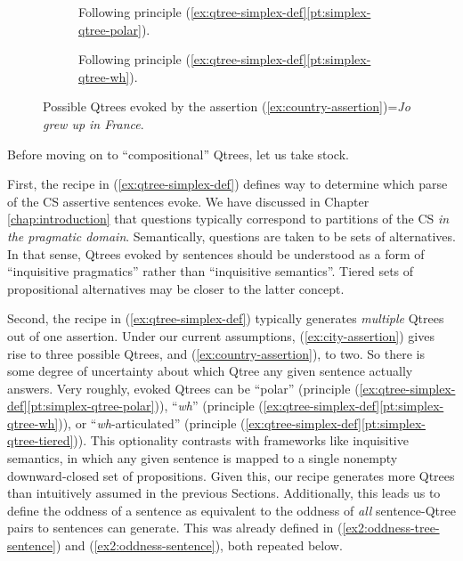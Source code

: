 \begin{figure}[H]
	\centering
	\begin{subfigure}[t]{.45\linewidth}
		\centering
		\caption{Following principle (\ref{ex:qtree-simplex-def}\ref{pt:simplex-qtree-polar}).}\label{fig:country-qtree-polar}
	\end{subfigure}
	\hfill
	\begin{subfigure}[t]{.45\linewidth}
		\centering		{}
		\caption{Following principle (\ref{ex:qtree-simplex-def}\ref{pt:simplex-qtree-wh}).}\label{fig:country-qtree-wh}
	\end{subfigure}
	\caption{Possible Qtrees evoked by the assertion (\ref{ex:country-assertion})=\textit{Jo grew up in France}.}
\end{figure}


Before moving on to ``compositional'' Qtrees, let us take stock.

First, the recipe in (\ref{ex:qtree-simplex-def}) defines way to determine which parse of the CS assertive sentences evoke. We have discussed in Chapter \ref{chap:introduction} that questions typically correspond to partitions of the CS \textit{in the pragmatic domain}. Semantically, questions are taken to be sets of alternatives. In that sense, Qtrees evoked by sentences should be understood as a form of ``inquisitive pragmatics'' rather than ``inquisitive semantics''. Tiered sets of propositional alternatives may be closer to the latter concept.

Second, the recipe in (\ref{ex:qtree-simplex-def}) typically generates \textit{multiple} Qtrees out of one assertion. Under our current assumptions,  (\ref{ex:city-assertion}) gives rise to three possible Qtrees, and (\ref{ex:country-assertion}), to two. So there is some degree of uncertainty about which Qtree any given sentence actually answers. Very roughly, evoked Qtrees can be ``polar'' (principle (\ref{ex:qtree-simplex-def}\ref{pt:simplex-qtree-polar})), ``\textit{wh}'' (principle (\ref{ex:qtree-simplex-def}\ref{pt:simplex-qtree-wh})), or ``\textit{wh}-articulated'' (principle (\ref{ex:qtree-simplex-def}\ref{pt:simplex-qtree-tiered})). This optionality contrasts with frameworks like inquisitive semantics, in which any given sentence is mapped to a single nonempty downward-closed set of propositions. Given this, our recipe generates more Qtrees than intuitively assumed in the previous Sections.  Additionally, this leads us to define the oddness of a sentence as equivalent to the oddness of \textit{all} sentence-Qtree pairs to sentences can generate. This was already defined in (\ref{ex2:oddness-tree-sentence}) and (\ref{ex2:oddness-sentence}), both repeated below.

